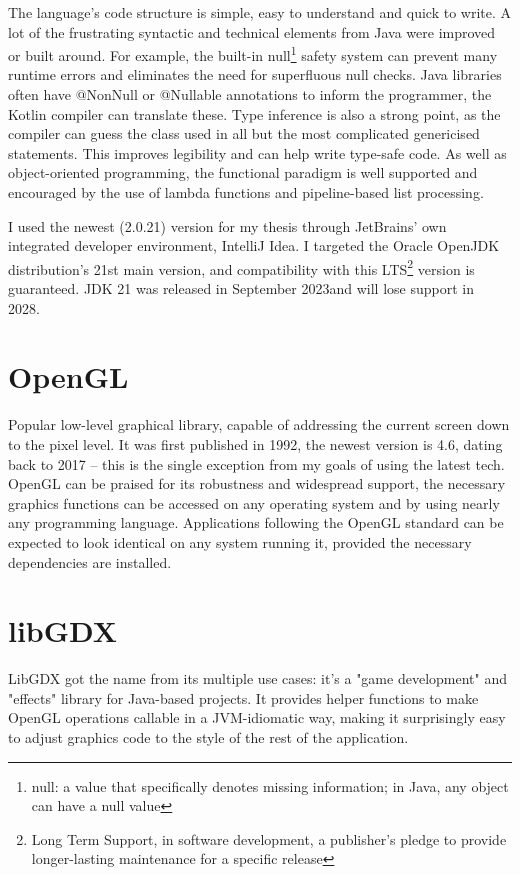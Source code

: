 The language's code structure is simple, easy to understand and quick to write. A lot of the frustrating syntactic and technical elements from Java were improved or built around. For example, the built-in null\footnote{null: a value that specifically denotes missing information; in Java, any object can have a null value} safety system can prevent many runtime errors and eliminates the need for superfluous null checks. Java libraries often have @NonNull or @Nullable annotations to inform the programmer, the Kotlin compiler can translate these. Type inference is also a strong point, as the compiler can guess the class used in all but the most complicated genericised statements. This improves legibility and can help write type-safe code. As well as object-oriented programming, the functional paradigm is well supported and encouraged by the use of lambda functions and pipeline-based list processing.


I used the newest (2.0.21) version for my thesis through JetBrains' own integrated developer environment, IntelliJ Idea. I targeted the Oracle OpenJDK distribution's 21st main version, and compatibility with this LTS\footnote{Long Term Support, in software development, a publisher's pledge to provide longer-lasting maintenance for a specific release} version is guaranteed. JDK 21 was released in September 2023and will lose support in 2028.~\cite{JavaRoadmap}

\section{OpenGL}

Popular low-level graphical library, capable of addressing the current screen down to the pixel level. It was first published in 1992, the newest version is 4.6, dating back to 2017 -- this is the single exception from my goals of using the latest tech.~\cite{OpenglHistory} OpenGL can be praised for its robustness and widespread support, the necessary graphics functions can be accessed on any operating system and by using nearly any programming language. Applications following the OpenGL standard can be expected to look identical on any system running it, provided the necessary dependencies are installed.

\section{libGDX}

LibGDX got the name from its multiple use cases: it's a "game development" and "effects" library for Java-based projects. It provides helper functions to make OpenGL operations callable in a JVM-idiomatic way, making it surprisingly easy to adjust graphics code to the style of the rest of the application.

